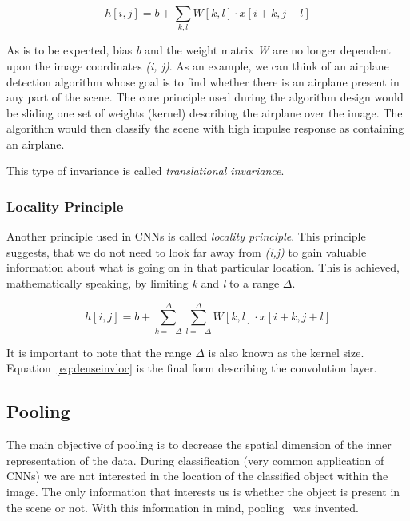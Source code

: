 \begin{equation}
    \label{eq:denseinv}
    h[i, j] = b + \sum_{k,l} W[k,l] \cdot x[i+k,j+l]
\end{equation}

As is to be expected, bias \textit{b} and the weight matrix \textit{W} are no longer dependent upon the image
coordinates \textit{(i, j)}.
As an example, we can think of an airplane detection algorithm whose goal is to find whether there is an airplane
present in any part of the scene.
The core principle used during the algorithm design would be sliding one set of weights (kernel) describing the
airplane over the image.
The algorithm would then classify the scene with high impulse response as containing an airplane.

This type of invariance is called \textit{translational invariance}.

\subsubsection{Locality Principle}\label{subsec:locality}
Another principle used in CNNs is called \textit{locality principle}.
This principle suggests, that we do not need to look far away from \textit{(i,j)} to gain valuable information about
what is going on in that particular location.
This is achieved, mathematically speaking, by limiting \textit{k} and \textit{l} to a range $\Delta$.

\begin{equation}
    \label{eq:denseinvloc}
    h[i, j] = b + \sum_{k=-\Delta}^{\Delta} \sum_{l=-\Delta}^{\Delta} W[k,l] \cdot x[i+k,j+l]
\end{equation}

It is important to note that the range $\Delta$ is also known as the kernel size.
Equation~\ref{eq:denseinvloc} is the final form describing the convolution layer.

\subsection{Pooling}\label{subsec:pooling}
The main objective of pooling is to decrease the spatial dimension of the inner representation of the data.
During classification (very common application of CNNs) we are not interested in the location of the classified
object within the image.
The only information that interests us is whether the object is present in the scene or not.
With this information in mind, pooling~\cite{PoolingLayer} was invented.

